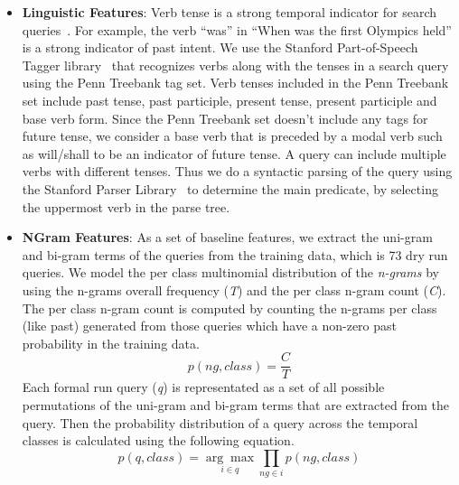 \documentclass{sig-alternate}
\begin{document}
\begin{itemize}
In the dry run queries only 16 out of 100 contained time expressions that can be used to estimate the time distance, this reflects how rare it is to find explicit or implicit temporal expressions in a search query. Thus in order to obtain more candidate temporal expressions for the formal and dry run queries, we used the freely accessible GTE\footnote{http://www.ccc.ipt.pt/~ricardo/software.html} web service detailed in \cite{gte}. Given a query, the GTE web service returns a set of candidate years extracted from the \textit{top 50 web snippets} returned by the Bing Search API.  
\item\textbf{Linguistic Features}:
Verb tense is a strong temporal indicator for search queries~\cite{tuta}. For example, the verb ``was'' in ``When was the first Olympics held'' is a strong indicator of past intent. We use the Stanford Part-of-Speech Tagger library~\cite{postagger} that recognizes verbs along with the tenses in a search query using the Penn Treebank tag set. Verb tenses included in the Penn Treebank set include past tense, past participle, present tense, present participle and base verb form. Since the Penn Treebank set doesn't include any tags for future tense, we consider a base verb that is preceded by a modal verb such as will/shall to be an indicator of future tense. A query can include multiple verbs with different tenses. Thus we do a syntactic parsing of the query using the Stanford Parser Library~\cite{parser} to determine the main predicate, by selecting the uppermost verb in the parse tree. 
\item\textbf{NGram Features}:
As a set of baseline features, we extract the uni-gram and bi-gram terms of the queries from the training data, which is 73 dry run queries. We model the per class multinomial distribution of the \textit{n-grams} by using the n-grams overall frequency (\textit{T}) and the per class n-gram count (\textit{C}). The per class n-gram count is computed by counting the n-grams per class (like past) generated from those queries which have a non-zero past probability in the training data.
\begin{equation}\label{eq:1}
p(ng, class) = \frac{C}{T}
\end{equation}
Each formal run query (\textit{q}) is representated as a set of all possible permutations of the uni-gram and bi-gram terms that are extracted from the query. Then the probability distribution of a query across the temporal classes is calculated using the following equation.
\begin{equation}\label{eq:2}
p(q,class) =\underset{i\in q}{\arg\max}\prod_{ng \in i}p(ng, class)
\end{equation}
\end{itemize}
\end{document}
